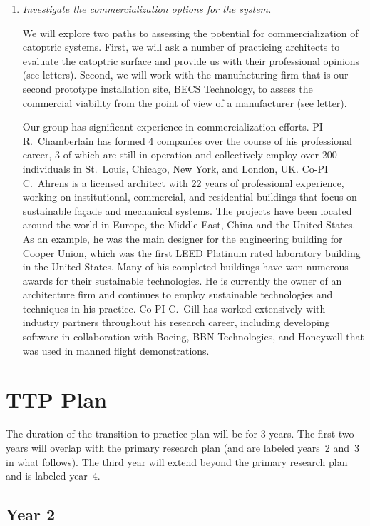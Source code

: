 \documentclass[11pt]{article}
\begin{document}
\begin{enumerate}
\item \emph{Investigate the commercialization options for the system.}

We will explore two paths to assessing the potential for commercialization
of catoptric systems.
First, we will ask a number of practicing architects to evaluate the
catoptric surface and provide us with their professional opinions
(see letters).
Second, we will work with the manufacturing firm that is our second
prototype installation site, BECS Technology, to assess the commercial
viability from the point of view of a manufacturer (see letter).

Our group has significant experience in commercialization efforts.
PI R.~Chamberlain has formed 4 companies over the course of his professional
career, 3 of which are still in operation and collectively employ
over 200 individuals in St.~Louis, Chicago, New York, and London, UK.
Co-PI C.~Ahrens is a licensed architect with 22 years of professional
experience, working on institutional, commercial, and residential
buildings that focus on sustainable fa\c{c}ade and mechanical systems.
The projects have been located around the world in Europe, the Middle East,
China and the United States. As an example, he was the main designer for
the engineering building for Cooper Union, which was the first
LEED Platinum rated laboratory building in the United States.
Many of his completed buildings have won numerous awards for their
sustainable technologies.
He is currently the owner of an architecture firm and continues
to employ sustainable technologies and techniques in his practice.  
Co-PI C.~Gill has worked extensively with industry partners throughout his
research career, including developing software in collaboration with Boeing, 
BBN Technologies, and Honeywell that was used in manned flight demonstrations.

\end{enumerate}

\section{TTP Plan}

The duration of the transition to practice plan will be for 3 years.
The first two years will overlap with the primary research plan (and
are labeled years~2 and~3 in what follows).  The third year will extend
beyond the primary research plan and is labeled year~4.

\subsection*{Year 2}
\end{document}
